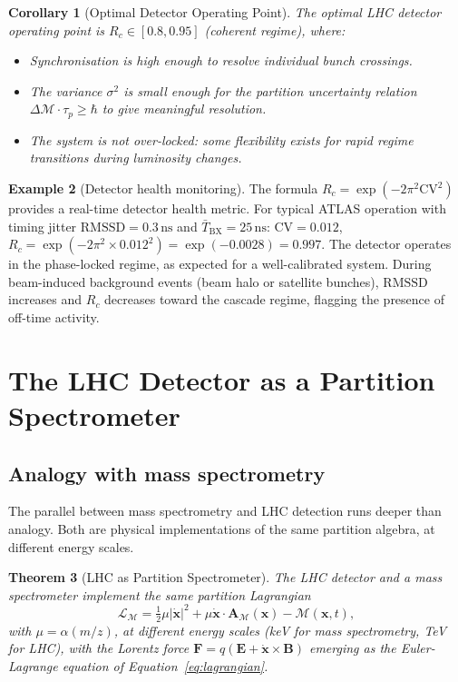 \documentclass[twocolumn,10pt,a4paper]{article}
\theoremstyle{thmstyle}
\newtheorem{theorem}{Theorem}[section]
\newtheorem{corollary}[theorem]{Corollary}
\theoremstyle{definition}
\newtheorem{example}[theorem]{Example}
\theoremstyle{remark}
\begin{document}
\begin{corollary}[Optimal Detector Operating Point]
\label{cor:optimal}
The optimal LHC detector operating point is $R_c \in [0.8, 0.95]$
(coherent regime), where:
\begin{itemize}[nosep]
\item Synchronisation is high enough to resolve individual bunch crossings.
\item The variance $\sigma^2$ is small enough for the partition uncertainty
relation $\Delta\mathcal{M} \cdot \tau_p \geq \hbar$ to give meaningful
resolution.
\item The system is not over-locked: some flexibility exists for rapid
regime transitions during luminosity changes.
\end{itemize}
\end{corollary}

\begin{example}[Detector health monitoring]
The formula $R_c = \exp(-2\pi^2\mathrm{CV}^2)$ provides a real-time
detector health metric. For typical ATLAS operation with timing jitter
$\mathrm{RMSSD} = 0.3\,\mathrm{ns}$ and $\bar T_{\mathrm{BX}} = 25\,\mathrm{ns}$:
$\mathrm{CV} = 0.012$,
$R_c = \exp(-2\pi^2 \times 0.012^2) = \exp(-0.0028) = 0.997$.
The detector operates in the phase-locked regime, as expected for
a well-calibrated system. During beam-induced background events (beam halo
or satellite bunches), $\mathrm{RMSSD}$ increases and $R_c$ decreases toward
the cascade regime, flagging the presence of off-time activity.
\end{example}

\section{The LHC Detector as a Partition Spectrometer}
\label{sec:spectrometer}

\subsection{Analogy with mass spectrometry}

The parallel between mass spectrometry and LHC detection runs deeper than
analogy. Both are physical implementations of the same partition algebra,
at different energy scales.

\begin{theorem}[LHC as Partition Spectrometer]
\label{thm:spectrometer}
The LHC detector and a mass spectrometer implement the same partition
Lagrangian
\begin{equation}
\mathcal{L}_\mathcal{M} = \tfrac{1}{2}\mu|\dot{\mathbf{x}}|^2
+ \mu\dot{\mathbf{x}}\cdot\mathbf{A}_\mathcal{M}(\mathbf{x})
- \mathcal{M}(\mathbf{x}, t),
\label{eq:lagrangian}
\end{equation}
with $\mu = \alpha(m/z)$, at different energy scales (keV for mass spectrometry,
TeV for LHC), with the Lorentz force $\mathbf{F} = q(\mathbf{E} +
\dot{\mathbf{x}}\times\mathbf{B})$ emerging as the Euler-Lagrange equation
of Equation~\eqref{eq:lagrangian}.
\end{theorem}
\end{document}
